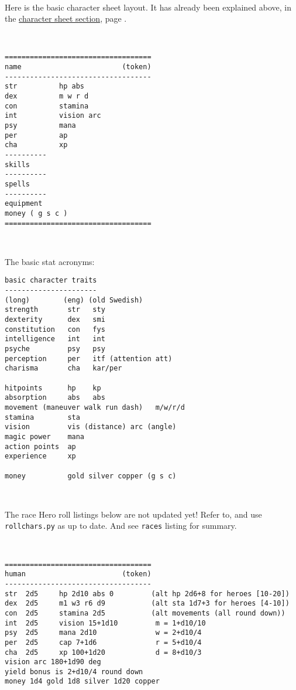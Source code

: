\

Here is the basic character sheet layout. It has already been explained above, in the \hyperref[sec:charsheet]{character sheet section}, page \pageref{sec:charsheet}.

\

\goodbreak
\begin{samepage} \begin{verbatim}
===================================
name                        (token)
-----------------------------------
str          hp abs
dex          m w r d
con          stamina
int          vision arc
psy          mana
per          ap
cha          xp
----------
skills
----------
spells
----------
equipment
money ( g s c )
===================================
\end{verbatim} \end{samepage}

\

\goodbreak 
\begin{samepage}
\noindent The basic stat acronyms:
\begin{verbatim}
basic character traits
----------------------
(long)        (eng) (old Swedish)
strength       str   sty
dexterity      dex   smi
constitution   con   fys
intelligence   int   int
psyche         psy   psy
perception     per   itf (attention att)
charisma       cha   kar/per

hitpoints      hp    kp
absorption     abs   abs
movement (maneuver walk run dash)   m/w/r/d
stamina        sta
vision         vis (distance) arc (angle)
magic power    mana
action points  ap
experience     xp

money          gold silver copper (g s c)
\end{verbatim} \end{samepage}

\


\TODO The race Hero roll listings below are not updated yet! Refer to, and use \verb|rollchars.py| as up to date. And see \verb|races| listing for summary.

\


\small

\goodbreak \begin{samepage} \begin{verbatim}
===================================
human                       (token)
-----------------------------------
str  2d5     hp 2d10 abs 0         (alt hp 2d6+8 for heroes [10-20])
dex  2d5     m1 w3 r6 d9           (alt sta 1d7+3 for heroes [4-10])
con  2d5     stamina 2d5           (alt movements (all round down))
int  2d5     vision 15+1d10         m = 1+d10/10
psy  2d5     mana 2d10              w = 2+d10/4
per  2d5     cap 7+1d6              r = 5+d10/4
cha  2d5     xp 100+1d20            d = 8+d10/3
vision arc 180+1d90 deg
yield bonus is 2+d10/4 round down
money 1d4 gold 1d8 silver 1d20 copper
\end{verbatim} \end{samepage}

